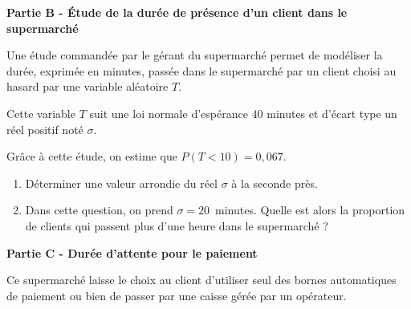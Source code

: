 \documentclass[10pt]{article}
\begin{document}
\bigskip

\textbf{Partie B - Étude de la durée de présence d'un client dans le supermarché}

\medskip

Une étude commandée par le gérant du supermarché permet de modéliser la durée, exprimée en
minutes, passée dans le supermarché par un client choisi au hasard par une variable aléatoire $T$.

Cette variable $T$ suit une loi normale d'espérance $40$ minutes et d'écart type un réel positif noté $\sigma$.

Grâce à cette étude, on estime que $P(T < 10) = 0,067$.

\medskip

\begin{enumerate}
\item Déterminer une valeur arrondie du réel $\sigma$ à la seconde près.
\item Dans cette question, on prend $\sigma = 20$~minutes. Quelle est alors la proportion de clients qui
passent plus d'une heure dans le supermarché ?
\end{enumerate}

\bigskip

\textbf{Partie C - Durée d'attente pour le paiement}

\medskip

Ce supermarché laisse le choix au client d'utiliser seul des bornes automatiques de paiement ou
bien de passer par une caisse gérée par un opérateur.

\medskip
\end{document}
